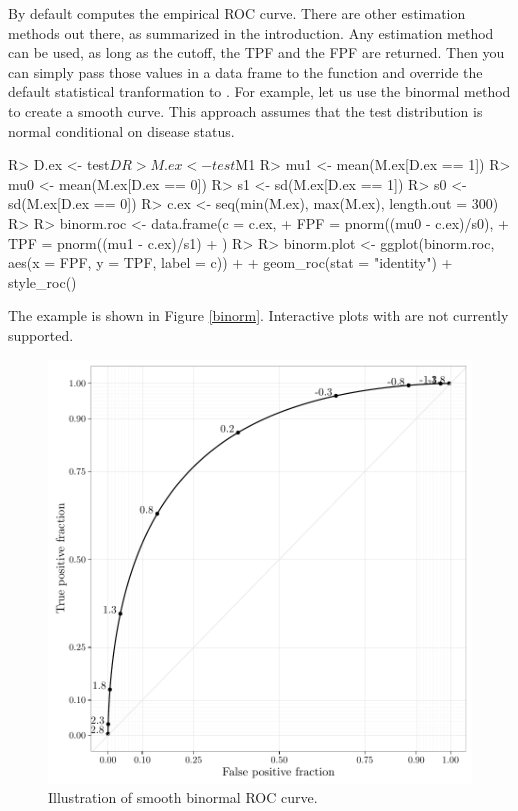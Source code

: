 \documentclass[codesnippet]{jss}
\begin{document}
By default  computes the empirical ROC curve. There
are other estimation methods out there, as summarized in the
introduction. Any estimation method can be used, as long as the cutoff,
the TPF and the FPF are returned. Then you can simply pass those values
in a data frame to the  function and override the default
statistical tranformation to . For example, let us
use the binormal method to create a smooth curve. This approach assumes
that the test distribution is normal conditional on disease status.

\begin{Schunk}
\begin{Sinput}
R> D.ex <- test$D
R> M.ex <- test$M1
R> mu1 <- mean(M.ex[D.ex == 1])
R> mu0 <- mean(M.ex[D.ex == 0])
R> s1 <- sd(M.ex[D.ex == 1])
R> s0 <- sd(M.ex[D.ex == 0])
R> c.ex <- seq(min(M.ex), max(M.ex), length.out = 300)
R> 
R> binorm.roc <- data.frame(c = c.ex, 
+                              FPF = pnorm((mu0 - c.ex)/s0), 
+                              TPF = pnorm((mu1 - c.ex)/s1)
+                              )
R> 
R> binorm.plot <- ggplot(binorm.roc, aes(x = FPF, y = TPF, label = c)) + 
+   geom_roc(stat = "identity") + style_roc()
\end{Sinput}
\end{Schunk}

The example is shown in Figure \ref{binorm}. Interactive plots with
 are not currently supported.

\begin{Schunk}
\begin{figure}
\includegraphics{figure/binormal-1} \caption[Illustration of smooth binormal ROC curve]{Illustration of smooth binormal ROC curve. \label{binorm}}\label{fig:binormal}
\end{figure}
\end{Schunk}
\end{document}
